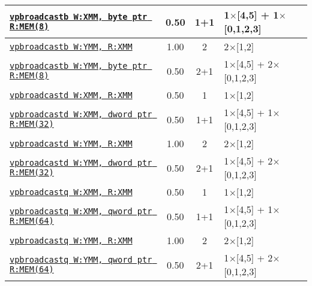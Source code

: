\documentclass[a4paper,english,fontsize=9]{scrartcl}
\begin{document}
\begin{longtable}{p{}ccL{.25\textwidth}}
  \midrule
  \texttt{\href{https://felixcloutier.com/x86/VPBROADCASTB:VPBROADCASTW:VPBROADCASTD:VPBROADCASTQ.html}{vpbroadcastb W:XMM, byte ptr R:MEM(8)}} & 0.50 & 1+1 & 1\(\times\)[4,5] + 1\(\times\)[0,1,2,3] \\
  \midrule
  \texttt{\href{https://felixcloutier.com/x86/VPBROADCASTB:VPBROADCASTW:VPBROADCASTD:VPBROADCASTQ.html}{vpbroadcastb W:YMM, R:XMM}} & 1.00 & 2 & 2\(\times\)[1,2] \\
  \midrule
  \texttt{\href{https://felixcloutier.com/x86/VPBROADCASTB:VPBROADCASTW:VPBROADCASTD:VPBROADCASTQ.html}{vpbroadcastb W:YMM, byte ptr R:MEM(8)}} & 0.50 & 2+1 & 1\(\times\)[4,5] + 2\(\times\)[0,1,2,3] \\
  \midrule
  \texttt{\href{https://felixcloutier.com/x86/VPBROADCASTB:VPBROADCASTW:VPBROADCASTD:VPBROADCASTQ.html}{vpbroadcastd W:XMM, R:XMM}} & 0.50 & 1 & 1\(\times\)[1,2] \\
  \midrule
  \texttt{\href{https://felixcloutier.com/x86/VPBROADCASTB:VPBROADCASTW:VPBROADCASTD:VPBROADCASTQ.html}{vpbroadcastd W:XMM, dword ptr R:MEM(32)}} & 0.50 & 1+1 & 1\(\times\)[4,5] + 1\(\times\)[0,1,2,3] \\
  \midrule
  \texttt{\href{https://felixcloutier.com/x86/VPBROADCASTB:VPBROADCASTW:VPBROADCASTD:VPBROADCASTQ.html}{vpbroadcastd W:YMM, R:XMM}} & 1.00 & 2 & 2\(\times\)[1,2] \\
  \midrule
  \texttt{\href{https://felixcloutier.com/x86/VPBROADCASTB:VPBROADCASTW:VPBROADCASTD:VPBROADCASTQ.html}{vpbroadcastd W:YMM, dword ptr R:MEM(32)}} & 0.50 & 2+1 & 1\(\times\)[4,5] + 2\(\times\)[0,1,2,3] \\
  \midrule
  \texttt{\href{https://felixcloutier.com/x86/VPBROADCASTB:VPBROADCASTW:VPBROADCASTD:VPBROADCASTQ.html}{vpbroadcastq W:XMM, R:XMM}} & 0.50 & 1 & 1\(\times\)[1,2] \\
  \midrule
  \texttt{\href{https://felixcloutier.com/x86/VPBROADCASTB:VPBROADCASTW:VPBROADCASTD:VPBROADCASTQ.html}{vpbroadcastq W:XMM, qword ptr R:MEM(64)}} & 0.50 & 1+1 & 1\(\times\)[4,5] + 1\(\times\)[0,1,2,3] \\
  \midrule
  \texttt{\href{https://felixcloutier.com/x86/VPBROADCASTB:VPBROADCASTW:VPBROADCASTD:VPBROADCASTQ.html}{vpbroadcastq W:YMM, R:XMM}} & 1.00 & 2 & 2\(\times\)[1,2] \\
  \midrule
  \texttt{\href{https://felixcloutier.com/x86/VPBROADCASTB:VPBROADCASTW:VPBROADCASTD:VPBROADCASTQ.html}{vpbroadcastq W:YMM, qword ptr R:MEM(64)}} & 0.50 & 2+1 & 1\(\times\)[4,5] + 2\(\times\)[0,1,2,3] \\

\end{longtable}
\end{document}
